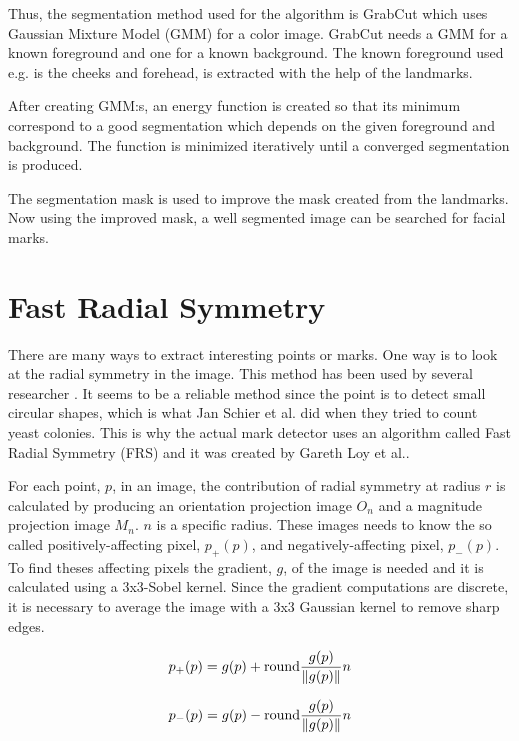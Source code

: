 Thus, the segmentation method used for the algorithm is GrabCut which uses Gaussian Mixture Model (GMM) for a color image. GrabCut needs a GMM for a known foreground and one for a known background. The known foreground used e.g. is the cheeks and forehead, is extracted with the help of the landmarks. 

After creating GMM:s, an energy function is created so that its minimum correspond to a good segmentation which depends on the given foreground and background. The function is minimized iteratively until a converged segmentation is produced.

The segmentation mask is used to improve the mask created from the landmarks. Now using the improved mask, a well segmented image can be searched for facial marks. 

\section{Fast Radial Symmetry} \label{sec:FRS} 

There are many ways to extract interesting points or marks. One way is to look at the radial symmetry in the image. This method has been used by several researcher \cite{twins,FRS,automatic_detector_2015,yeast}. It seems to be a reliable method since the point is to detect small circular shapes, which is what Jan Schier et al.\cite{yeast} did when they tried to count yeast colonies. This is why the actual mark detector uses an algorithm called Fast Radial Symmetry (FRS) and it was created by Gareth Loy et al.\cite{FRS}. 

For each point, $p$, in an image, the contribution of radial symmetry at radius $r$ is calculated by producing an orientation projection image $O_n$ and a magnitude projection image $M_n$. $n$ is a specific radius. These images needs to know the so called positively-affecting pixel, $p_{+}(p)$, and negatively-affecting pixel, $p_{-}(p)$. To find theses affecting pixels the gradient, $g$, of the image is needed and it is calculated using a 3x3-Sobel kernel. Since the gradient computations are discrete, it is necessary to average the image with a 3x3 Gaussian kernel to remove sharp edges. 

\begin{equation} \label{eq:p+}
p_{+}(p) = g(p) + \text{round}\frac{g(p)}{\lVert g(p)\rVert}n
\end{equation}

\begin{equation} \label{eq:p-}
p_{-}(p) = g(p) - \text{round}\frac{g(p)}{\lVert g(p)\rVert}n
\end{equation}


